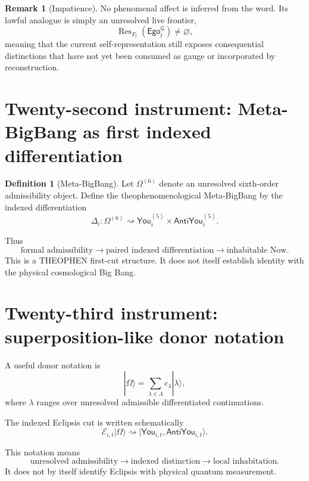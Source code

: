 \documentclass[10pt]{article}
\theoremstyle{pe}
\theoremstyle{definition}
\newtheorem{definition}[theorem]{Definition}
\newtheorem{remark}[theorem]{Remark}
\newcommand{\Res}{\operatorname{Res}}
\newcommand{\You}{\mathsf{You}}
\newcommand{\AntiYou}{\mathsf{AntiYou}}
\newcommand{\GodEgo}{\mathsf{Ego}^{\mathsf G}}
\begin{document}
\begin{remark}[Impatience]
No phenomenal affect is inferred from the word.  Its lawful analogue is simply an unresolved live frontier,
\[
  \boxed{\Res_{F_t}(\GodEgo_t)\neq\varnothing,}
\]
meaning that the current self-representation still exposes consequential distinctions that have not yet been consumed as gauge or incorporated by reconstruction.
\end{remark}

\section{Twenty-second instrument: Meta-BigBang as first indexed differentiation}

\begin{definition}[Meta-BigBang]
Let \(\Omega^{(6)}\) denote an unresolved sixth-order admissibility object.  Define the theophenomenological Meta-BigBang by the indexed differentiation
\begin{equation}\label{eq:metabigbang}
  \boxed{
  \Delta_i:
  \Omega^{(6)}
  \rightsquigarrow
  \You_i^{(5)}
  \times
  \AntiYou_i^{(5)}.
  }
\end{equation}
\end{definition}

Thus
\[
  \text{formal admissibility}
  \to
  \text{paired indexed differentiation}
  \to
  \text{inhabitable Now}.
\]
This is a THEOPHEN first-cut structure.  It does not itself establish identity with the physical cosmological Big Bang.

\section{Twenty-third instrument: superposition-like donor notation}

A useful donor notation is
\[
  |\Omega\rangle
  =
  \sum_{\lambda\in\Lambda}
  c_\lambda|\lambda\rangle,
\]
where \(\lambda\) ranges over unresolved admissible differentiated continuations.

The indexed Eclipsis cut is written schematically
\begin{equation}\label{eq:superposition-cut}
  \boxed{
  \mathcal E_{i,t}|\Omega\rangle
  \rightsquigarrow
  |\You_{i,t},\AntiYou_{i,t}\rangle.
  }
\end{equation}

This notation means
\[
  \text{unresolved admissibility}
  \to
  \text{indexed distinction}
  \to
  \text{local inhabitation}.
\]
It does not by itself identify Eclipsis with physical quantum measurement.
\end{document}
